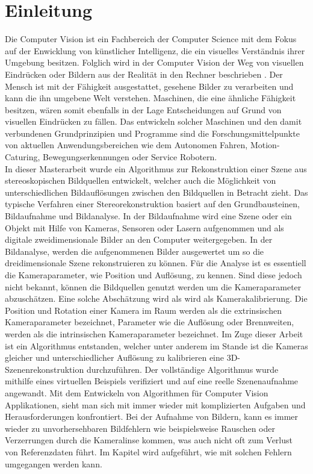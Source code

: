 \chapter{Einleitung}
\label{sec:einleitung} 



Die Computer Vision ist ein Fachbereich der Computer Science mit dem Fokus auf der Enwicklung von künstlicher Intelligenz, die ein visuelles Verständnis ihrer Umgebung besitzen. Folglich wird in der Computer Vision der Weg von visuellen Eindrücken oder Bildern aus der Realität in den Rechner beschrieben \cite{ComputerVision}. Der Mensch ist mit der Fähigkeit ausgestattet, gesehene Bilder zu verarbeiten und  kann die ihn umgebene Welt verstehen. Maschinen, die eine ähnliche Fähigkeit besitzen, wären somit ebenfalls in der Lage Entscheidungen auf Grund von visuellen Eindrücken zu fällen. Das entwickeln solcher Maschinen und den damit verbundenen Grundprinzipien und Programme sind die Forschungsmittelpunkte von aktuellen Anwendungsbereichen wie dem Autonomen Fahren, Motion-Caturing, Bewegungserkennungen oder Service Robotern.\\

In dieser Masterarbeit wurde ein Algorithmus zur Rekonstruktion einer Szene aus stereoskopischen Bildquellen entwickelt, welcher auch die Möglichkeit von unterschiedlichen Bildauflösungen zwischen den Bildquellen in Betracht zieht. Das typische Verfahren einer Stereorekonstruktion basiert auf den Grundbausteinen, Bildaufnahme und Bildanalyse\cite{ComputerVision}. In der Bildaufnahme wird eine Szene oder ein Objekt mit Hilfe von Kameras, Sensoren oder Lasern aufgenommen und als digitale zweidimensionale Bilder an den Computer weitergegeben. In der Bildanalyse, werden die aufgenommenen Bilder ausgewertet um so die dreidimensionale Szene rekonstruieren zu können. Für die Analyse ist es essentiell die Kameraparameter, wie Position und Auflösung, zu kennen. Sind diese jedoch nicht bekannt, können die Bildquellen genutzt werden um die Kameraparameter abzuschätzen. Eine solche Abschätzung wird als wird als Kamerakalibrierung\cite{HZ,Ferid,Elements,ZZGXr}. Die Position und Rotation einer Kamera im Raum werden als die extrinsischen Kameraparameter bezeichnet, Parameter wie die Auflösung oder Brennweiten, werden als die intrinsischen Kameraparameter bezeichnet\cite{HZ,Ferid}. Im Zuge dieser Arbeit ist ein Algorithmus entstanden, welcher unter anderem im Stande ist die Kameras gleicher und unterschiedlicher Auflösung zu kalibrieren eine 3D-Szenenrekonstruktion durchzuführen. Der vollständige Algorithmus wurde mithilfe eines virtuellen Beispiels verifiziert und auf eine reelle Szenenaufnahme angewandt. Mit dem Entwickeln von Algorithmen für Computer Vision Applikationen, sieht man sich mit immer wieder mit komplizierten Aufgaben und Herausforderungen konfrontiert. Bei der Aufnahme von Bildern, kann es immer wieder zu unvorhersehbaren Bildfehlern wie beispielsweise Rauschen oder Verzerrungen durch die Kameralinse kommen, was auch nicht oft zum Verlust von Referenzdaten führt. Im Kapitel  wird aufgeführt, wie mit solchen Fehlern umgegangen werden kann.\\

